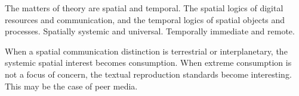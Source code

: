 \documentclass[12pt,twocolumn]{article}
\begin{document}
The matters of theory are spatial and temporal.  The spatial logics of
digital resources and communication, and the temporal logics of
spatial objects and processes.  Spatially systemic and universal.
Temporally immediate and remote.

When a spatial communication distinction is terrestrial or
interplanetary, the systemic spatial interest becomes consumption.
When extreme consumption is not a focus of concern, the textual
reproduction standards become interesting.  This may be the case of
peer media.




\end{document}
